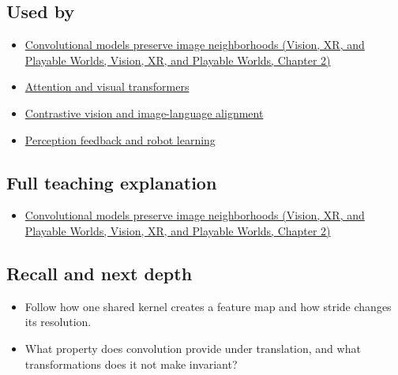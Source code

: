 \subsection{Used by}\label{appendix-47c51ea026fb-used-by}

\begin{itemize}
\tightlist
\item
  \href{../07-Vision-XR-and-Playable-Worlds/main.pdf\#nameddest=04-visual-computing-ii-ch031-convolutional-models-preserve-image-neighborhoods}{Convolutional models preserve image neighborhoods (Vision, XR, and Playable Worlds, Vision, XR, and Playable Worlds, Chapter 2)}
\item
  \hyperref[appendix-a9d5dfdd164a]{Attention and visual transformers}
\item
  \hyperref[appendix-772f1fd96148]{Contrastive vision and image-language alignment}
\item
  \hyperref[appendix-b0c42da325f1]{Perception feedback and robot learning}
\end{itemize}

\subsection{Full teaching explanation}\label{appendix-47c51ea026fb-full-teaching-explanation}

\begin{itemize}
\tightlist
\item
  \href{../07-Vision-XR-and-Playable-Worlds/main.pdf\#nameddest=04-visual-computing-ii-ch031-convolutional-models-preserve-image-neighborhoods}{Convolutional models preserve image neighborhoods (Vision, XR, and Playable Worlds, Vision, XR, and Playable Worlds, Chapter 2)}
\end{itemize}

\subsection{Recall and next depth}\label{appendix-47c51ea026fb-recall-and-next-depth}

\begin{itemize}
\tightlist
\item
  Follow how one shared kernel creates a feature map and how stride changes its resolution.
\item
  What property does convolution provide under translation, and what transformations does it not make invariant?
\end{itemize}

